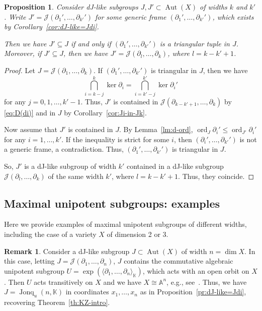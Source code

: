 \documentclass[12pt,a4paper]{amsart}
\theoremstyle{plain}
\newtheorem{proposition}[theorem]{Proposition}
\theoremstyle{definition}
\newtheorem{remark}[theorem]{Remark}
\theoremstyle{remark}
\def\Aut{\operatorname{Aut}}
\def\ord{\operatorname{ord}}
\def\AA{{\mathbb A}}
\def\K{{\mathbb K}}
\def\J{{\mathcal J}}
\DeclareMathOperator{\Jonq}{Jonq}
\begin{document}
\begin{proposition}\label{pr:J'<J}
   Consider dJ-like subgroups $J,J'\subset\Aut(X)$ of widths $k$ and $k'$.
   Write $J'=\J(\partial_1',\ldots,\partial_{k'}')$ for some generic frame $(\partial_1',\ldots,\partial_{k'}')$, which exists by Corollary~\ref{cor:dJ-like=Jdi}.
   
   Then we have $J'\subseteq J$ if and only if $(\partial_1',\ldots,\partial_{k'}')$ is a triangular tuple in $J$.
   Moreover, if $J'\subseteq J$, then we have $J'=\J(\partial_l,\ldots,\partial_k)$, where $l=k-k'+1$.
\end{proposition}
\begin{proof}
   Let $J=\J(\partial_1,\ldots,\partial_k)$.
   If  $(\partial_1',\ldots,\partial_{k'}')$ is triangular in $J$, then
   we have 
   \[
      \bigcap_{i=k-j}^k\ker\partial_i=\bigcap_{i=k'-j}^{k'}\ker\partial_i'
   \]
   for any $j=0,1,\ldots,k'-1$. Thus, $J'$ is contained in $\J(\partial_{k-k'+1},\ldots,\partial_k)$ by \eqref{eq:D(di)} and in $J$ by Corollary~\ref{cor:Ji-in-Jk}.

   Now assume that $J'$ is contained in $J$. 
   By Lemma~\ref{lm:d-ord}, $\ord_J\partial_i'\le \ord_{J'}\partial_i'$ for any $i=1,\ldots,k'$.
   If the inequality is strict for some $i$, then $(\partial_i',\ldots,\partial_{k'}')$ is not a generic frame, a contradiction.
   Thus, $(\partial_1',\ldots,\partial_{k'}')$ is triangular in $J$.

   So, $J'$ is a dJ-like subgroup of width $k'$ contained in a dJ-like subgroup $\J(\partial_{l},\ldots,\partial_k)$ of the same width $k'$, where $l=k-k'+1$.
   Thus, they coincide. 
\end{proof}




\subsection{Maximal unipotent subgroups: examples} \label{sec:max-ex}
Here we provide examples of maximal unipotent subgroups of different widths, including the case of a variety $X$ of dimension 2 or 3.

\begin{remark}\label{rm:k=n}
     Consider a dJ-like subgroup $J\subset\Aut(X)$ of width $n=\dim X$. 
     In this case, letting $J=\J(\partial_1,\ldots,\partial_n)$, $J$ contains the commutative algebraic unipotent subgroup $U=\exp(\langle \partial_1,\ldots,\partial_n\rangle_\K)$, which acts with an open orbit on $X$. 
     Then $U$ acts transitively on $X$ and we have $X\cong\AA^n$, e.g., see~\cite[Corollary~2.2]{GMM17}. 
     Thus, we have $J=\Jonq_u(n,\K)$ in coordinates $x_1,\ldots,x_n$ as in Proposition~\ref{pr:dJ-like=Jdi}, recovering Theorem~\ref{th:KZ-intro}.
   \end{remark}
\end{document}
